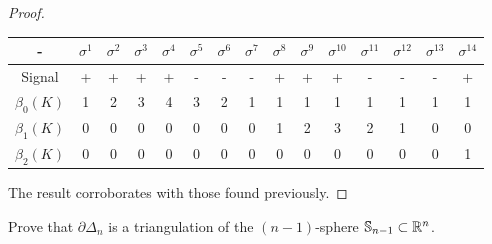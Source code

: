 \begin{proof}
\begin{enumerate}
    \begin{center}
        \begin{tabular}{ c|c|c|c|c|c|c|c|c|c|c|c|c|c|c}
         - & $\sigma^1$ & $\sigma^2$ & $\sigma^3$ & $\sigma^4$ & $\sigma^5$ &
         $\sigma^6$ & $\sigma^7$ &$\sigma^8$ &$\sigma^9$ &$\sigma^{10}$
         &$\sigma^{11}$ &$\sigma^{12}$ &$\sigma^{13}$ &$\sigma^{14}$ \\ 
         \hline
         Signal & + & + & + & + & - & - & - & + & + & + & - & - & - & + \\  
         $\beta_0(K)$ & 1 & 2 & 3 & 4 & 3 & 2 & 1 & 1 & 1 & 1 & 1 & 1 & 1 & 1\\ 
         $\beta_1(K)$ & 0 & 0 & 0 & 0 & 0 & 0 & 0 & 1 & 2 & 3 & 2 & 1 & 0 & 0 \\     
         $\beta_2(K)$ & 0 & 0 & 0 & 0 & 0 & 0 & 0 & 0 & 0 & 0 & 0 & 0 & 0 & 1\\     

        \end{tabular}
    \end{center}

\end{enumerate}

The result corroborates with those found previously. 

\end{proof}

\noindent\linia

\begin{exercise}
    Prove that $\partial \Delta_n$ is a triangulation of the $(n -1)$-sphere
    $\mathbb{S}_{n-1} \subset \mathbb{R}^n$. 
\end{exercise}

